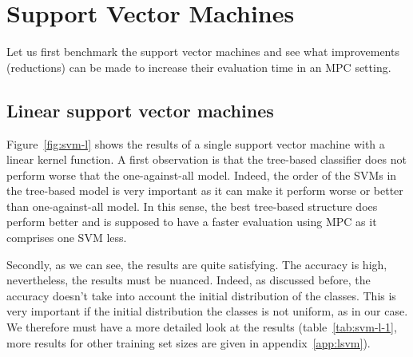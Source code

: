 \newpage
\section{Support Vector Machines}
Let us first benchmark the support vector machines and see what improvements (reductions) can be made to increase their evaluation time in an MPC setting.

\subsection{Linear support vector machines}
Figure~\ref{fig:svm-l} shows the results of a single support vector machine with a linear kernel function. A first observation is that the tree-based classifier does not perform worse that the one-against-all model. Indeed, the order of the SVMs in the tree-based model is very important as it can make it perform worse or better than one-against-all model. In this sense, the best tree-based structure does perform better and is supposed to have a faster evaluation using MPC as it comprises one SVM less.

Secondly, as we can see, the results are quite satisfying. The accuracy is high, nevertheless, the results must be nuanced. Indeed, as discussed before, the accuracy doesn't take into account the initial distribution of the classes. This is very important if the initial distribution the classes is not uniform, as in our case. We therefore must have a more detailed look at the results (table~\ref{tab:svm-l-1}, more results for other training set sizes are given in appendix~\ref{app:lsvm}).

